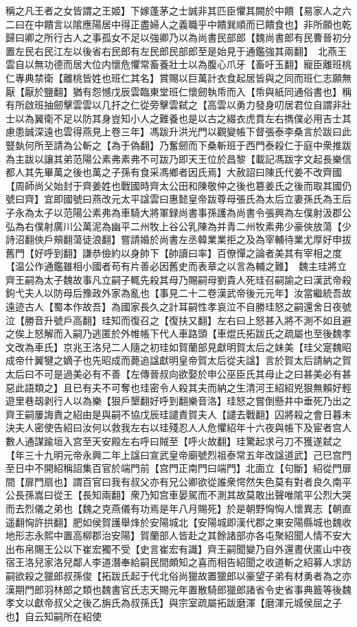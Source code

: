 稱之凡王者之女皆謂之王姬】下嫁蓬茅之士誠非其匹臣懼其闕於中饋【易家人之六二曰在中饋言以隂應陽居中得正盡婦人之義職乎中饋巽順而已饋食也】非所願也乾歸曰卿之所行古人之事孤女不足以強卿乃以為尚書民部郎【魏尚書郎有民曹晉初分置左民右民江左以後省右民郎有左民郎民部郎至是始見于通鑑強其兩翻】　北燕王雲自以無功德而居大位内懷危懼常畜養壯士以為腹心爪牙【畜吁玉翻】寵臣離班桃仁專典禁衛【離桃皆姓也班仁其名】賞賜以巨萬計衣食起居皆與之同而班仁志願無厭【厭於鹽翻】猶有怨憾戊辰雲臨東堂班仁懷劒執帋而入【帋與紙同通俗書也】稱有所啟班抽劒擊雲雲以几扞之仁從旁擊雲弑之【高雲以勇力發身叨居君位自謂非壯士以為翼衛不足以防其身豈知小人之難養也是以古之綴衣虎賁左右擕僕必用吉士其慮患誠深遠也雲得燕見上卷三年】馮跋升洪光門以觀變帳下督張泰李桑言於跋曰此豎埶何所至請為公斬之【為于偽翻】乃奮劒而下桑斬班于西門泰殺仁于庭中衆推跋為主跋以讓其弟范陽公素弗素弗不可跋乃即天王位於昌黎【載記馮跋字文起長樂信都人其先畢萬之後也萬之子孫有食采馮鄉者因氏焉】大赦詔曰陳氏代姜不改齊國【周師尚父始封于齊姜姓也戰國時齊太公田和陳敬仲之後也簒姜氏之後而取其國仍號曰齊】宜即國號曰燕改元太平諡雲曰惠懿皇帝跋尊母張氏為太后立妻孫氏為王后子永為太子以范陽公素弗為車騎大將軍録尚書事孫護為尚書令張興為左僕射汲郡公弘為右僕射廣川公萬泥為幽平二州牧上谷公乳陳為并青二州牧素弗少豪俠放蕩【少詩沼翻俠戶頰翻蕩徒浪翻】嘗請婚於尚書左丞韓業業拒之及為宰輔待業尤厚好申拔舊門【好呼到翻】謙恭儉約以身帥下【帥讀曰率】百僚憚之論者美其有宰相之度【温公作通鑑雖相小國者苟有片善必因舊史而表章之以言為輔之難】　魏主珪將立齊王嗣為太子魏故事凡立嗣子輒先殺其母乃賜嗣母劉貴人死珪召嗣諭之曰漢武帝殺鉤弋夫人以防母后豫政外家為亂也【事見二十二卷漢武帝後元元年】汝當繼統吾故遠迹古人【蜀本作故吾】為國家長久之計耳嗣性孝哀泣不自勝珪怒之嗣還舍日夜號泣【勝音升號戶高翻】珪知而復召之【復扶又翻】左右曰上怒甚入將不測不如且避之俟上怒解而入嗣乃逃匿於外帷帳下代人車路頭【車焜氏拓跋氏之疏屬也至後魏孝文改為車氏】京兆王洛兒二人隨之初珪如賀蘭部見獻明賀太后之妹美【珪父寔魏昭成帝什翼犍之嫡子也先昭成而薨追諡獻明皇帝賀太后從夫諡】言於賀太后請納之賀太后曰不可是過美必有不善【左傳晉叔向欲娶於申公巫臣氏其母止之曰甚美必有甚惡此語類之】且已有夫不可奪也珪密令人殺其夫而納之生清河王紹紹兇狠無賴好輕遊里巷刼剥行人以為樂【狠戶墾翻好呼到翻樂音洛】珪怒之嘗倒懸井中垂死乃出之齊王嗣屢誨責之紹由是與嗣不協戊辰珪譴責賀夫人【譴去戰翻】囚將殺之會日暮未決夫人密使告紹曰汝何以救我左右以珪殘忍人人危懼紹年十六夜與帳下及宦者宫人數人通謀踰垣入宫至天安殿左右呼曰賊至【呼火故翻】珪驚起求弓刀不獲遂弑之【年三十九明元帝永興二年上諡曰宣武皇帝廟號烈祖泰常五年改諡道武】己巳宫門至日中不開紹稱詔集百官於端門前【宫門正南門曰端門】北面立【句斷】紹從門扉間【扉門扇也】謂百官曰我有叔父亦有兄公卿欲從誰衆愕然失色莫有對者良久南平公長孫嵩曰從王【長知兩翻】衆乃知宫車晏駕而不測其故莫敢出聲唯隂平公烈大哭而去烈儀之弟也【魏之克燕儀有功焉是年八月賜死】於是朝野恟恟人懷異志【朝直遥翻恟許拱翻】肥如侯賀護舉烽於安陽城北【安陽城即漢代郡之東安陽縣城也魏收地形志永熙中置高柳郡治安陽】賀蘭部人皆赴之其餘諸部亦各屯聚紹聞人情不安大出布帛賜王公以下崔宏獨不受【史言崔宏有識】齊王嗣聞變乃自外還晝伏匿山中夜宿王洛兒家洛兒鄰人李道潛奉給嗣民間頗知之喜而相告紹聞之收道斬之紹募人求訪嗣欲殺之獵郎叔孫俊【拓跋氏起于代北俗尚獵故置獵郎以豪望子弟有材勇者為之亦漢期門郎羽林郎之類也魏書官氏志天賜元年置散騎郎獵郎諸省令史省事典籖等後魏孝文以獻帝叔父之後乙旃氏為叔孫氏】與宗室疏屬拓跋磨渾【磨渾元城侯屈之子也】自云知嗣所在紹使